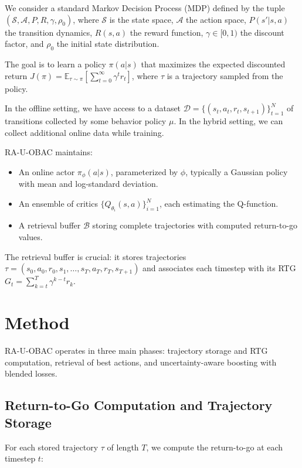 \documentclass[11pt,a4paper]{article}
\begin{document}
We consider a standard Markov Decision Process (MDP) defined by the tuple $(\mathcal{S}, \mathcal{A}, P, R, \gamma, \rho_0)$, where $\mathcal{S}$ is the state space, $\mathcal{A}$ the action space, $P(s'|s,a)$ the transition dynamics, $R(s,a)$ the reward function, $\gamma \in [0,1)$ the discount factor, and $\rho_0$ the initial state distribution.

The goal is to learn a policy $\pi(a|s)$ that maximizes the expected discounted return $J(\pi) = \mathbb{E}_{\tau \sim \pi} [\sum_{t=0}^\infty \gamma^t r_t]$, where $\tau$ is a trajectory sampled from the policy.

In the offline setting, we have access to a dataset $\mathcal{D} = \{ (s_t, a_t, r_t, s_{t+1}) \}_{t=1}^N$ of transitions collected by some behavior policy $\mu$. In the hybrid setting, we can collect additional online data while training.

RA-U-OBAC maintains:
\begin{itemize}
  \item An online actor $\pi_\phi(a|s)$, parameterized by $\phi$, typically a Gaussian policy with mean and log-standard deviation.
  \item An ensemble of critics $\{Q_{\theta_i}(s,a)\}_{i=1}^N$, each estimating the Q-function.
  \item A retrieval buffer $\mathcal{B}$ storing complete trajectories with computed return-to-go values.
\end{itemize}

The retrieval buffer is crucial: it stores trajectories $\tau = (s_0, a_0, r_0, s_1, \dots, s_T, a_T, r_T, s_{T+1})$ and associates each timestep with its RTG $G_t = \sum_{k=t}^T \gamma^{k-t} r_k$.

\section{Method}
\label{sec:method}

RA-U-OBAC operates in three main phases: trajectory storage and RTG computation, retrieval of best actions, and uncertainty-aware boosting with blended losses.

\subsection{Return-to-Go Computation and Trajectory Storage}
\label{subsec:rtg}

For each stored trajectory $\tau$ of length $T$, we compute the return-to-go at each timestep $t$:
\end{document}

